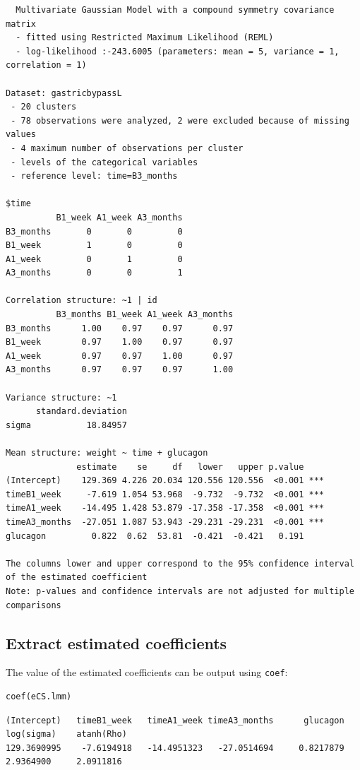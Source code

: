 \documentclass[12pt]{article}
\begin{document}
\begin{verbatim}
  Multivariate Gaussian Model with a compound symmetry covariance matrix 
  - fitted using Restricted Maximum Likelihood (REML) 
  - log-likelihood :-243.6005 (parameters: mean = 5, variance = 1, correlation = 1)
 
Dataset: gastricbypassL 
 - 20 clusters 
 - 78 observations were analyzed, 2 were excluded because of missing values 
 - 4 maximum number of observations per cluster 
 - levels of the categorical variables 
 - reference level: time=B3_months 
 
$time
          B1_week A1_week A3_months
B3_months       0       0         0
B1_week         1       0         0
A1_week         0       1         0
A3_months       0       0         1

Correlation structure: ~1 | id 
          B3_months B1_week A1_week A3_months
B3_months      1.00    0.97    0.97      0.97
B1_week        0.97    1.00    0.97      0.97
A1_week        0.97    0.97    1.00      0.97
A3_months      0.97    0.97    0.97      1.00

Variance structure: ~1 
      standard.deviation
sigma           18.84957

Mean structure: weight ~ time + glucagon 
              estimate    se     df   lower   upper p.value    
(Intercept)    129.369 4.226 20.034 120.556 120.556  <0.001 ***
timeB1_week     -7.619 1.054 53.968  -9.732  -9.732  <0.001 ***
timeA1_week    -14.495 1.428 53.879 -17.358 -17.358  <0.001 ***
timeA3_months  -27.051 1.087 53.943 -29.231 -29.231  <0.001 ***
glucagon         0.822  0.62  53.81  -0.421  -0.421   0.191    

The columns lower and upper correspond to the 95% confidence interval of the estimated coefficient
Note: p-values and confidence intervals are not adjusted for multiple comparisons
\end{verbatim}

\clearpage

\subsection{Extract estimated coefficients}
\label{sec:org83fdac5}
The value of the estimated coefficients can be output using \texttt{coef}:
\lstset{language=r,label= ,caption= ,captionpos=b,numbers=none}
\begin{lstlisting}
coef(eCS.lmm)
\end{lstlisting}

\begin{verbatim}
(Intercept)   timeB1_week   timeA1_week timeA3_months      glucagon    log(sigma)    atanh(Rho) 
129.3690995    -7.6194918   -14.4951323   -27.0514694     0.8217879     2.9364900     2.0911816
\end{verbatim}
\end{document}
